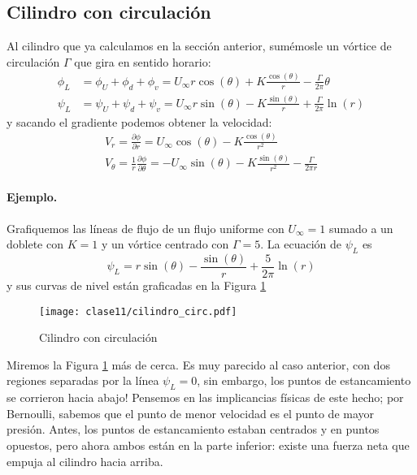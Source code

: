 \subsection*{Cilindro con circulación}
Al cilindro que ya calculamos en la sección anterior, sumémosle un vórtice de circulación $\Gamma$ que gira en sentido horario:
%
\begin{align}\label{eq:cilindro_circ_pot}
\phi_L &= \phi_U+\phi_d+\phi_v = U_\infty r\cos(\theta) + K\frac{\cos(\theta)}{r} - \frac{\Gamma}{2\pi}\theta \nonumber\\
\psi_L &= \psi_U+\psi_d+\psi_v = U_\infty r\sin(\theta) - K\frac{\sin(\theta)}{r} + \frac{\Gamma}{2\pi}\ln(r)
\end{align}
%
y sacando el gradiente podemos obtener la velocidad:
%
\begin{align}\label{eq:cilindro_circ_vel}
V_r = \frac{\partial\phi}{\partial r} = U_\infty\cos(\theta) - K\frac{\cos(\theta)}{r^2} \nonumber\\
V_\theta = \frac{1}{r}\frac{\partial\phi}{\partial\theta} = -U_\infty\sin(\theta) - K\frac{\sin(\theta)}{r^2} - \frac{\Gamma}{2\pi r}
\end{align}

\paragraph*{Ejemplo.}
Grafiquemos las líneas de flujo de un flujo uniforme con $U_\infty=1$ sumado a un doblete con $K=1$ y un vórtice centrado con $\Gamma=5$.
La ecuación de $\psi_L$ es
%
\begin{equation}
\psi_L = r\sin(\theta) - \frac{\sin(\theta)}{r} + \frac{5}{2\pi}\ln(r)
\end{equation}
%
y sus curvas de nivel están graficadas en la Figura \ref{fig:cilindro_circ}
%
\begin{figure}[h!]
\centering
\texttt{[image: clase11/cilindro\_circ.pdf]}
\caption{Cilindro con circulación}
\label{fig:cilindro_circ}
\end{figure}

Miremos la Figura \ref{fig:cilindro_circ} más de cerca.
Es muy parecido al caso anterior, con dos regiones separadas por la línea $\psi_L=0$, sin embargo, los puntos de estancamiento se corrieron hacia abajo!
Pensemos en las implicancias físicas de este hecho; por Bernoulli, sabemos que el punto de menor velocidad es el punto de mayor presión.
Antes, los puntos de estancamiento estaban centrados y en puntos opuestos, pero ahora ambos están en la parte inferior: existe una fuerza neta que empuja al cilindro hacia arriba.

